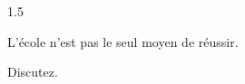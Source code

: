 \documentclass[12pt]{article}
\begin{document}
\begin{spacing}{1.5}

L'école n'est pas le seul moyen de réussir.

Discutez.

\quad

\end{spacing}
\end{document}
